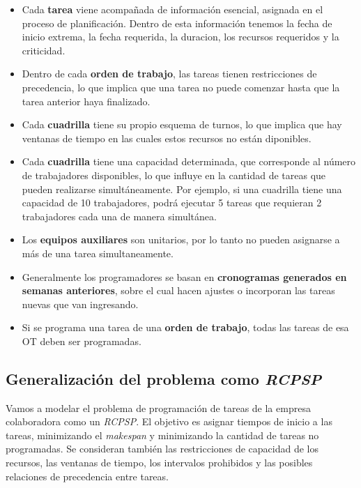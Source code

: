 \documentclass{article}
\begin{document}
\begin{itemize}
    \item Cada \textbf{tarea} viene acompañada de información esencial, asignada en el proceso de planificación. Dentro de esta información tenemos la fecha de inicio extrema, la fecha requerida, la duracion, los recursos requeridos y la criticidad.
    \item Dentro de cada \textbf{orden de trabajo}, las tareas tienen restricciones de precedencia, lo que implica que una tarea no puede comenzar hasta que la tarea anterior haya finalizado.
    
    \item Cada \textbf{cuadrilla} tiene su propio esquema de turnos, lo que implica que hay ventanas de tiempo en las cuales estos recursos no están diponibles.
    
    \item Cada \textbf{cuadrilla} tiene una capacidad determinada, que corresponde al número de trabajadores disponibles, lo que influye en la cantidad de tareas que pueden realizarse simultáneamente. Por ejemplo, si una cuadrilla tiene una capacidad de 10 trabajadores, podrá ejecutar 5 tareas que requieran 2 trabajadores cada una de manera simultánea.
    \item Los \textbf{equipos auxiliares} son unitarios, por lo tanto no pueden asignarse a más de una tarea simultaneamente.
    \item Generalmente los programadores se basan en \textbf{cronogramas generados en semanas anteriores}, sobre el cual hacen ajustes o incorporan las tareas nuevas que van ingresando.
    \item Si se programa una tarea de una \textbf{orden de trabajo}, todas las tareas de esa OT deben ser programadas.

\end{itemize}


\subsection{Generalización del problema como \textit{RCPSP}}

Vamos a modelar el problema de programación de tareas de la empresa colaboradora como un \textit{RCPSP}. El objetivo es asignar tiempos de inicio a las tareas, minimizando el \textit{makespan} y minimizando la cantidad de tareas no programadas. Se consideran también las restricciones de capacidad de los recursos, las ventanas de tiempo, los intervalos prohibidos y las posibles relaciones de precedencia entre tareas.
\end{document}
